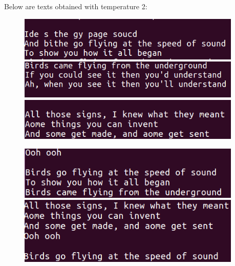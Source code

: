 \documentclass{article}
\begin{document}
\begin{flushleft}
\begin{itemize}
Below are texts obtained with temperature 2:
\begin{figure}[H]
\begin{minipage}{0.3\textwidth}
\centering
\includegraphics[width=0.95\textwidth]{100(1)-2.png}
\end{minipage}
\hfill
\begin{minipage}{0.3\textwidth}
\centering
\includegraphics[width=0.95\textwidth]{100(2)-2.png}
\end{minipage}
\hfill
\begin{minipage}{0.3\textwidth}
\centering
\includegraphics[width=0.95\textwidth]{100(3)-2.png}
\end{minipage}
\end{figure}
\begin{figure}[H]
\begin{minipage}{0.475\textwidth}
\centering
\includegraphics[width=0.95\textwidth]{100(4)-2.png}
\end{minipage}
\hfill
\begin{minipage}{0.475\textwidth}
\centering
\includegraphics[width=0.95\textwidth]{100(5)-2.png}
\end{minipage}
\end{figure}


\end{itemize}
\end{flushleft}
\end{document}
